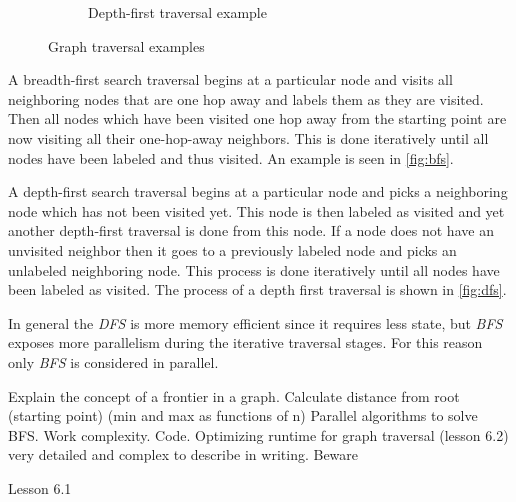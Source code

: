 \begin{figure}
		\begin{subfigure}[b]{0.3\textwidth}
		\begin{center}
		\end{center}
		\caption{Depth-first traversal example}
		\label{fig:dfs}
	\end{subfigure}

	\caption{Graph traversal examples}
\end{figure}
A breadth-first search traversal begins at a particular node and visits all neighboring nodes that are one hop away and labels them as they are visited. 
Then all nodes which have been visited one hop away from the starting point are now visiting all their one-hop-away neighbors. 
This is done iteratively until all nodes have been labeled and thus visited.
An example is seen in \autoref{fig:bfs}.

A depth-first search traversal begins at a particular node and picks a neighboring node which has not been visited yet. 
This node is then labeled as visited and yet another depth-first traversal is done from this node. 
If a node does not have an unvisited neighbor then it goes to a previously labeled node and picks an unlabeled neighboring node. 
This process is done iteratively until all nodes have been labeled as visited.
The process of a depth first traversal is shown in \autoref{fig:dfs}.

In general the \textit{DFS} is more memory efficient since it requires less state, but \textit{BFS} exposes more parallelism during the iterative traversal stages.
For this reason only \textit{BFS} is considered in parallel.

Explain the concept of a frontier in a graph.
Calculate distance from root (starting point) (min and max as functions of n)
Parallel algorithms to solve BFS.
Work complexity.
Code.
Optimizing runtime for graph traversal (lesson 6.2) very detailed and complex to describe in writing. Beware

Lesson 6.1
